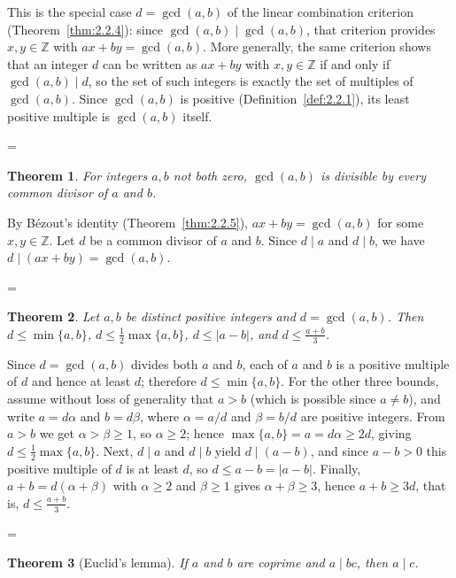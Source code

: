 \documentclass[11pt]{article}
\makeatletter
\theoremstyle{ntstyle}
\newtheorem{theorem}{Theorem}[subsection]
\let\nt@closedisplay\]
\def\nt@guardedclose{\@ifnextchar\par{\nt@closeafterpar}{\@ifnextchar\end{\postdisplaypenalty\@M\nt@closedisplay}{\nt@closedisplay}}}
\def\nt@closeafterpar\par{\@ifnextchar\par{\nt@closeafterpar}{\@ifnextchar\end{\postdisplaypenalty\@M\nt@closedisplay\par}{\nt@closedisplay\par}}}
\renewenvironment{proof}[1][\proofname]{\par
  \pushQED{\qed}\normalfont\topsep\medskipamount\edef\nt@afterproof{\@endparpenalty=\the\@endparpenalty\relax}\@beginparpenalty\@M\@endparpenalty\@M\let\]\nt@guardedclose\trivlist\item[]\textit{#1\@addpunct{.}} \ignorespaces}{\ifvmode\addpenalty\@M\fi\popQED\nt@afterproof\endtrivlist\@endpefalse}
\makeatother
\begin{document}
\begin{proof} This is the special case $d = \gcd(a, b)$ of
	the linear combination criterion (Theorem~\ref{thm:2.2.4}): since $\gcd(a, b)
		\mid \gcd(a, b)$, that criterion provides $x, y \in \mathbb{Z}$ with
	$ax + by = \gcd(a, b)$.
	More generally, the same criterion shows that an integer $d$ can be written as
	$ax+by$ with $x,y\in\mathbb{Z}$ if and only if $\gcd(a, b)\mid d$, so the set
	of such integers is exactly the set of multiples of $\gcd(a, b)$. Since
	$\gcd(a, b)$ is positive (Definition~\ref{def:2.2.1}), its least positive
	multiple is $\gcd(a, b)$ itself.

\end{proof}
\begin{theorem}\label{thm:2.2.6} For integers $a, b$ not both zero, $\gcd(a, b)$ is divisible by every common divisor of $a$ and $b$.

\end{theorem}

\begin{proof} By B{\'e}zout's identity (Theorem~\ref{thm:2.2.5}), $ax+by = \gcd(a, b)$ for some $x, y \in
		\mathbb{Z}$. Let $d$ be a common
	divisor of $a$ and $b$. Since $d \mid a$ and $d \mid b$, we have $d
		\mid (ax+by) = \gcd(a, b)$.

\end{proof}
\begin{theorem}\label{thm:2.2.7} Let $a,b$ be distinct positive integers and
	$d=\gcd(a, b)$. Then $d\le\min\{a, b\}$, $d\le\tfrac{1}{2}\max\{a, b\}$,
	$d\le|a-b|$, and $d\le\tfrac{a+b}{3}$.

\end{theorem}

\begin{proof} Since $d=\gcd(a, b)$ divides both $a$ and
	$b$, each of $a$ and $b$ is a positive multiple of $d$ and hence at least
		$d$; therefore $d\le\min\{a, b\}$. For the other three bounds, assume
	without loss of generality that $a>b$ (which is possible since $a\neq b$), and
	write $a=d\alpha$ and $b=d\beta$, where $\alpha=a/d$ and
	$\beta=b/d$ are positive integers. From $a>b$ we get
	$\alpha>\beta\ge1$, so $\alpha\ge2$; hence
	$\max\{a, b\}=a=d\alpha\ge2d$, giving $d\le\tfrac{1}{2}\max\{a, b\}$. Next,
	$d\mid a$ and $d\mid b$ yield $d\mid(a-b)$, and since
	$a-b>0$ this positive multiple of $d$ is at least $d$, so $d\le
		a-b=|a-b|$. Finally, $a+b=d(\alpha+\beta)$ with $\alpha\ge2$ and
	$\beta\ge1$ gives $\alpha+\beta\ge3$, hence $a+b\ge3d$, that is, $d\le\tfrac{a+b}{3}$.

\end{proof}
\begin{theorem}[Euclid's lemma]\label{thm:2.2.8} If $a$ and $b$ are coprime and
	$a \mid bc$, then $a \mid c$.

\end{theorem}
\end{document}
